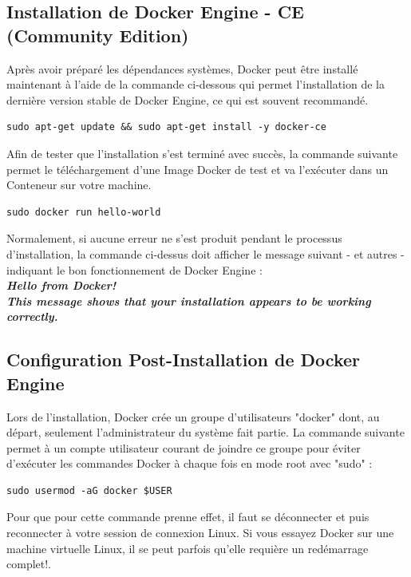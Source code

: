 \documentclass[a4paper,11pt,oneside]{report}
\begin{document}
\begin{appendices}
\subsection{Installation de Docker Engine - CE (Community Edition)}

Après avoir préparé les dépendances systèmes, Docker peut être installé maintenant à l'aide de la commande ci-dessous qui permet l'installation de la dernière version stable de Docker Engine, ce qui est souvent recommandé.
\begin{verbatim}
sudo apt-get update && sudo apt-get install -y docker-ce
\end{verbatim}

Afin de tester que l'installation s'est terminé avec succès, la commande suivante permet le téléchargement d'une Image Docker de test et va l'exécuter dans un Conteneur sur votre machine. 
\begin{verbatim}
sudo docker run hello-world
\end{verbatim}

Normalement, si aucune erreur ne s'est produit pendant le processus d'installation, la commande ci-dessus doit afficher le message suivant - et autres - indiquant le bon fonctionnement de Docker Engine :
\newline
{\scriptsize
  \emph{
    \textbf{\\
    Hello from Docker!\\
    This message shows that your installation appears to be working correctly.
    }
  }
}

\subsection{Configuration Post-Installation de Docker Engine}

Lors de l'installation, Docker crée un groupe d'utilisateurs "docker" dont, au départ, seulement l'administrateur du système fait partie. La commande suivante permet à un compte utilisateur courant de joindre ce groupe pour éviter d'exécuter les commandes Docker à chaque fois en mode root avec "sudo" :

\begin{verbatim}
sudo usermod -aG docker $USER
\end{verbatim}

Pour que pour cette commande prenne effet, il faut se déconnecter et puis reconnecter à votre session de connexion Linux. Si vous essayez Docker sur une machine virtuelle Linux, il se peut parfois qu'elle requière un redémarrage complet!.
\newline


\end{appendices}
\end{document}

